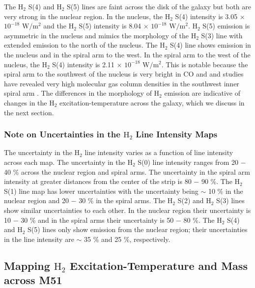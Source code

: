 \documentclass[manuscript]{aastex}
\begin{document}
The $\mathrm{H_2}$ S(4) and $\mathrm{H_2}$ S(5)  lines are faint across the disk of the galaxy but both are very strong in the nuclear region.  In the nucleus, the $\mathrm{H_2}$ S(4) intensity is 3.05 $\times$ $\mathrm{10^{-18}}$ $\mathrm{W/m^2}$ and the $\mathrm{H_2}$ S(5) intensity is 8.04 $\times$ $\mathrm{10^{-18}}$ $\mathrm{W/m^2}$.  $\mathrm{H_2}$ S(5) emission is asymmetric in the nucleus and mimics the morphology of the $\mathrm{H_2}$ S(3) line with extended emission to the north of the nucleus.  The $\mathrm{H_2}$ S(4) line shows emission in the nucleus and in the spiral arm to the west.  In the spiral arm to the west of the nucleus, the $\mathrm{H_2}$ S(4) intensity is 2.11 $\times$ $\mathrm{10^{-18}}$ $\mathrm{W/m^2}$.  This is notable because the spiral arm to the southwest of the nucleus is very bright in CO and and studies have revealed very high molecular gas column densities in the southwest inner spiral arm \citep{lor90}.  The differences in the morphology of $\mathrm{H_2}$ emission are indicative of changes in the $\mathrm{H_2}$ excitation-temperature across the galaxy, which we discuss in the next section.

\subsubsection{Note on Uncertainties in the $\mathrm{H_2}$ Line Intensity Maps}

The uncertainty in the $\mathrm{H_2}$ line intensity varies as a function of line intensity across each map.  The uncertainty in the $\mathrm{H_2}$ S(0) line intensity ranges from 20 $-$ 40 \% across the nuclear region and spiral arms.  The uncertainty in the spiral arm intensity at greater distances from the center of the strip is 80 $-$ 90 \%.  The $\mathrm{H_2}$ S(1) line map has lower uncertainties with the uncertainty being $\sim$ 10 \% in the nuclear region and 20 $-$ 30 \% in the spiral arms.  The $\mathrm{H_2}$ S(2) and $\mathrm{H_2}$ S(3) lines show similar uncertainties to each other.  In the nuclear region their uncertainty is 10 $-$ 30 \% and in the spiral arms their uncertainty is 50 $-$ 80 \%.  The $\mathrm{H_2}$ S(4) and $\mathrm{H_2}$ S(5) lines only show emission from the nuclear region; their uncertainties in the line intensity are $\sim$ 35 \% and 25 \%, respectively.

\subsection{Mapping $\mathrm{H_2}$ Excitation-Temperature and Mass across M51}
\end{document}

